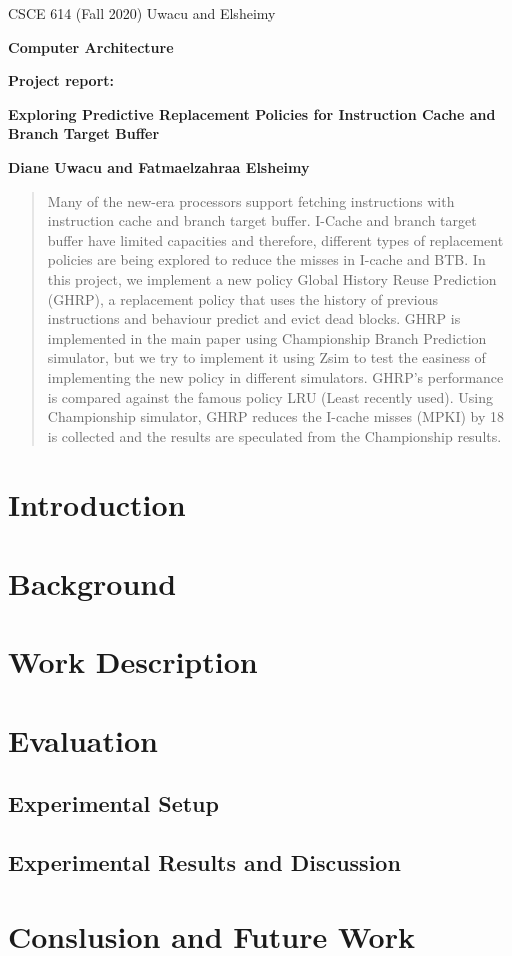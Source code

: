 \documentclass[11pt]{article}
\begin{document}
\centerline{CSCE 614 (Fall 2020) \hfill Uwacu and Elsheimy}
\medskip
\centerline{\bf Computer Architecture}
\medskip

\centerline{\bf  Project report: }

\bigskip

\centerline{\bf Exploring Predictive Replacement Policies for Instruction Cache and Branch Target Buffer}

\bigskip

\centerline{\bf Diane Uwacu and Fatmaelzahraa Elsheimy}

\bigskip

\begin{abstract}
Many of the new-era processors support fetching instructions with instruction cache and branch target buffer. I-Cache and branch target buffer have limited capacities and
therefore, different types of replacement policies are being explored to reduce the misses in I-cache and BTB. In this project, we implement a new policy Global History Reuse 
Prediction (GHRP), a replacement policy that uses the history of previous instructions and behaviour predict and evict dead blocks. GHRP is implemented in the main paper using
Championship Branch Prediction simulator, but we try to implement it using Zsim to test the easiness of implementing the new policy in different simulators. GHRP’s performance
is compared against the famous policy LRU (Least recently used). Using Championship simulator, GHRP reduces the I-cache misses (MPKI) by 18%
is collected and the results are speculated from the Championship results.
\end{abstract}

\section{Introduction} 
\label{sec:introduction}


\section{Background}
\label{sec:background}


\section{Work Description}
\label{sec:proposed}

\section{Evaluation}
\label{sec:timeline}

\subsection{Experimental Setup}

\subsection{Experimental Results and Discussion}

\section{Conslusion and Future Work}

{%
	
	
	}
\end{document}
